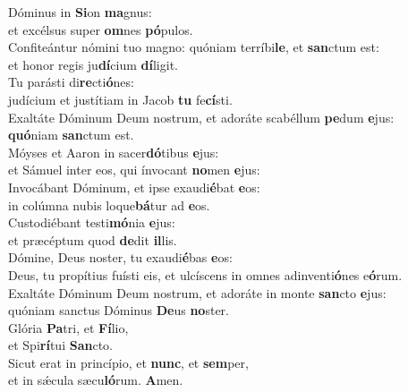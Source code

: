 \evenverse Dóminus in \textbf{Si}on \textbf{ma}gnus:~\*\\
\evenverse et excélsus super \textbf{om}nes \textbf{pó}pulos.\\
\oddverse Confiteántur nómini tuo magno: quóniam terríbi\textbf{le}, et \textbf{san}ctum est:~\*\\
\oddverse et honor regis ju\textbf{dí}cium \textbf{dí}ligit.\\
\evenverse Tu parásti di\textbf{re}cti\textbf{ó}nes:~\*\\
\evenverse judícium et justítiam in Jacob \textbf{tu} fe\textbf{cí}sti.\\
\oddverse Exaltáte Dóminum Deum nostrum, et adoráte scabéllum \textbf{pe}dum \textbf{e}jus:~\*\\
\oddverse \textbf{quó}niam \textbf{san}ctum est.\\
\evenverse Móyses et Aaron in sacer\textbf{dó}tibus \textbf{e}jus:~\*\\
\evenverse et Sámuel inter eos, qui ínvocant \textbf{no}men \textbf{e}jus:\\
\oddverse Invocábant Dóminum, et ipse exaudi\textbf{é}bat \textbf{e}os:~\*\\
\oddverse in colúmna nubis loque\textbf{bá}tur ad \textbf{e}os.\\
\evenverse Custodiébant testi\textbf{mó}nia \textbf{e}jus:~\*\\
\evenverse et præcéptum quod \textbf{de}dit \textbf{il}lis.\\
\oddverse Dómine, Deus noster, tu exaudi\textbf{é}bas \textbf{e}os:~\*\\
\oddverse Deus, tu propítius fuísti eis, et ulcíscens in omnes adinventi\textbf{ó}nes e\textbf{ó}rum.\\
\evenverse Exaltáte Dóminum Deum nostrum, et adoráte in monte \textbf{san}cto \textbf{e}jus:~\*\\
\evenverse quóniam sanctus Dóminus \textbf{De}us \textbf{no}ster.\\
\oddverse Glória \textbf{Pa}tri, et \textbf{Fí}lio,~\*\\
\oddverse et Spi\textbf{rí}tui \textbf{San}cto.\\
\evenverse Sicut erat in princípio, et \textbf{nunc}, et \textbf{sem}per,~\*\\
\evenverse et in sǽcula sæcu\textbf{ló}rum. \textbf{A}men.\\
